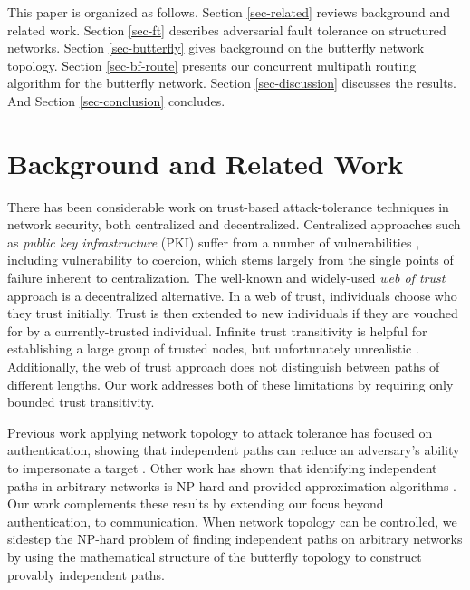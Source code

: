 \documentclass[10pt,letterpaper]{article}
\begin{document}
This paper is organized as follows.
Section \ref{sec-related} reviews background and related work.
Section \ref{sec-ft} describes adversarial fault tolerance on
structured networks.
Section \ref{sec-butterfly} gives background on the butterfly network topology.
Section \ref{sec-bf-route} presents our concurrent multipath routing
algorithm for the butterfly network.
Section \ref{sec-discussion} discusses the results.
And Section \ref{sec-conclusion} concludes.

\section*{Background and Related Work}
\label{sec-related}

There has been considerable work on trust-based attack-tolerance techniques
in network security, both centralized and decentralized.
Centralized approaches such as {\em public key infrastructure} (PKI)
suffer from a number of vulnerabilities
\cite{ellison_ten_2000}, including vulnerability to coercion,
which stems largely from the single points of failure inherent to
centralization.
The well-known and widely-used {\em web of trust} approach
\cite{zimmermann_official_1995,richters_trust_2011}
is a decentralized alternative.
In a web of trust,
individuals choose who they trust initially.
Trust is then extended to new individuals if they are vouched for by a
currently-trusted individual.
Infinite trust transitivity is helpful for establishing a large group of
trusted nodes, but unfortunately unrealistic
\cite{christianson_why_1997}.
Additionally, the web of trust approach
does not distinguish between paths of different lengths.
Our work addresses both of these limitations by requiring only
bounded trust transitivity.

Previous work applying network topology to attack tolerance has
focused on authentication,
showing that independent paths can reduce an adversary's ability
to impersonate a target
\cite{levien_attack-resistant_2009}.
Other work has shown that identifying independent paths in arbitrary networks
is NP-hard and provided approximation algorithms
\cite{reiter_resilient_1998}.
Our work complements these results by extending our focus beyond authentication,
to communication.
When network topology can be controlled, we sidestep the NP-hard problem of finding
independent paths on arbitrary networks by using the mathematical structure of
the butterfly topology to construct provably independent paths.
\end{document}
